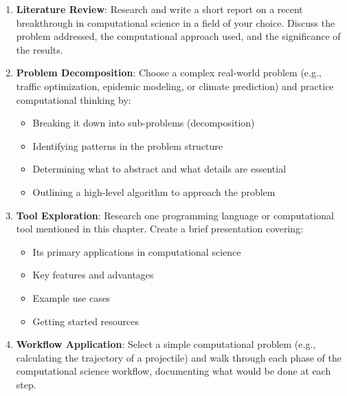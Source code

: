 \begin{enumerate}
  \item \textbf{Literature Review}: Research and write a short report on a recent breakthrough in computational science in a field of your choice. Discuss the problem addressed, the computational approach used, and the significance of the results.
      
  \item \textbf{Problem Decomposition}: Choose a complex real-world problem (e.g., traffic optimization, epidemic modeling, or climate prediction) and practice computational thinking by:
  \begin{itemize}
    \item Breaking it down into sub-problems (decomposition)
    \item Identifying patterns in the problem structure
    \item Determining what to abstract and what details are essential
    \item Outlining a high-level algorithm to approach the problem
  \end{itemize}
      
  \item \textbf{Tool Exploration}: Research one programming language or computational tool mentioned in this chapter. Create a brief presentation covering:
  \begin{itemize}
    \item Its primary applications in computational science
    \item Key features and advantages
    \item Example use cases
    \item Getting started resources
  \end{itemize}
      
  \item \textbf{Workflow Application}: Select a simple computational problem (e.g., calculating the trajectory of a projectile) and walk through each phase of the computational science workflow, documenting what would be done at each step.
\end{enumerate}